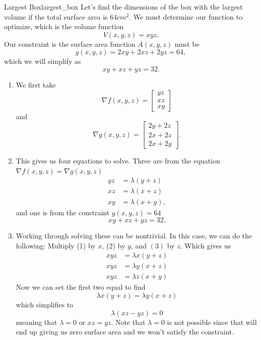         \begin{ex}{Largest Box}{largest_box}
        Let's find the dimensions of the box with the largest volume if the total surface area is $64 cm^2$.  We must determine our function to optimize, which is the volume function
        \[
        V(x,y,z) = xyz.
        \]
        Our constraint is the surface area function $A(x,y,z)$ must be
        \[
        g(x,y,z)=2xy+2xz+2yz=64,
        \]
        which we will simplify as
        \[
        xy+xz+yz = 32.
        \]
        \begin{enumerate}
            \item We first take
            \[
            \nabla f(x,y,z) = \begin{bmatrix} yz \\ xz \\ xy \end{bmatrix}
            \]
            and
            \[
            \nabla g(x,y,z) = \begin{bmatrix} 2y+2z \\ 2x+2z \\ 2x+2y\end{bmatrix}.
            \]
            \item This gives us four equations to solve. Three are from the equation $\nabla f(x,y,z) =\nabla g(x,y,z)$
            \begin{align}
                yz &= \lambda (y+z)\\
                xz &= \lambda (x+z)\\
                xy &= \lambda (x+y),
            \end{align}
            and one is from the constraint $g(x,y,z)=64$
            \[
            xy+xz+yz = 32.
            \]
            \item Working through solving these can be nontrivial.  In this case, we can do the following: Multiply (1) by $x$, (2) by $y$, and $(3)$ by $z$.  Which gives us
            \begin{align*}
                xyz &= \lambda x(y+z)\\
                xyz &= \lambda y(x+z)\\
                xyz &= \lambda z(x+y)
            \end{align*}
            Now we can set the first two equal to find
            \[
            \lambda x(y+z)=\lambda y(x+z)
            \]
            which simplifies to 
            \[
            \lambda (xz-yz)=0
            \]
            meaning that $\lambda =0$ or $xz=yz$. Note that $\lambda =0$ is not possible since that will end up giving us zero surface area and we won't satisfy the constraint.
            

\end{enumerate}
\end{ex}
